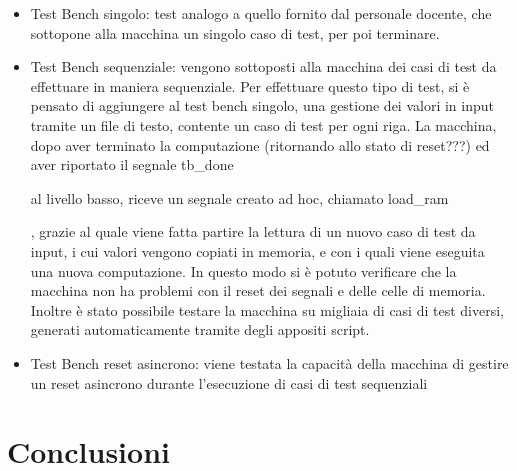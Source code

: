 \documentclass{article}
\newenvironment{gitFont}{\fontfamily{zi4}\selectfont}{\par}
\begin{document}
\begin{itemize}

\item Test Bench singolo: test analogo a quello fornito dal personale docente, che sottopone alla macchina un singolo caso di test, per poi terminare.

\item Test Bench sequenziale: vengono sottoposti alla macchina dei casi di test da effettuare in maniera sequenziale. Per effettuare questo tipo di test, si è pensato di aggiungere al test bench singolo, una gestione dei valori in input tramite un file di testo, contente un caso di test per ogni riga. La macchina, dopo aver terminato la computazione (ritornando allo stato di reset???) ed aver riportato il segnale \begin{gitFont}tb{\_}done \end{gitFont} al livello basso, riceve un segnale creato ad hoc, chiamato \begin{gitFont}load{\_}ram \end{gitFont}, grazie al quale viene fatta partire la lettura di un nuovo caso di test da input, i cui valori vengono copiati in memoria, e con i quali viene eseguita una nuova computazione. In questo modo si è potuto verificare che la macchina non ha problemi con il reset dei segnali e delle celle di memoria. Inoltre è stato possibile testare la macchina su migliaia di casi di test diversi, generati automaticamente tramite degli appositi script. 

\item Test Bench reset asincrono: viene testata la capacità della macchina di gestire un reset asincrono durante l'esecuzione di casi di test sequenziali 

\end{itemize}




\section{Conclusioni}
\end{document}
